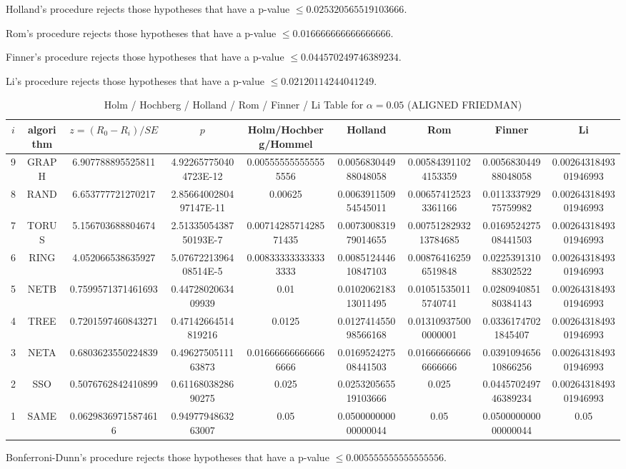 \documentclass[a4paper,10pt]{article}
\begin{document}
\begin{landscape}
Holland's procedure rejects those hypotheses that have a p-value $\le0.025320565519103666$.


Rom's procedure rejects those hypotheses that have a p-value $\le0.016666666666666666$.


Finner's procedure rejects those hypotheses that have a p-value $\le0.044570249746389234$.


Li's procedure rejects those hypotheses that have a p-value $\le0.02120114244041249$.



\newpage

\begin{table}[!htp]
\centering\scriptsize
\caption{Holm / Hochberg / Holland / Rom / Finner / Li Table for $\alpha=0.05$ (ALIGNED FRIEDMAN)}
\begin{tabular}{ccccccccc}
$i$&algorithm&$z=(R_0 - R_i)/SE$&$p$&Holm/Hochberg/Hommel&Holland&Rom&Finner&Li\\
\hline
9& GRAPH&6.907788895525811&4.922657750404723E-12&0.005555555555555556&0.005683044988048058&0.005843911024153359&0.005683044988048058&0.0026431849301946993\\
8& RAND&6.653777721270217&2.8566400280497147E-11&0.00625&0.006391150954545011&0.006574125233361166&0.011333792975759982&0.0026431849301946993\\
7& TORUS&5.156703688804674&2.5133505438750193E-7&0.0071428571428571435&0.007300831979014655&0.0075128293213784685&0.016952427508441503&0.0026431849301946993\\
6& RING&4.052066538635927&5.0767221396408514E-5&0.008333333333333333&0.008512444610847103&0.008764162596519848&0.022539131088302522&0.0026431849301946993\\
5& NETB&0.7599571371461693&0.4472802063409939&0.01&0.010206218313011495&0.010515350115740741&0.028094085180384143&0.0026431849301946993\\
4& TREE&0.7201597460843271&0.47142664514819216&0.0125&0.012741455098566168&0.013109375000000001&0.03361747021845407&0.0026431849301946993\\
3& NETA&0.6803623550224839&0.4962750511163873&0.016666666666666666&0.016952427508441503&0.016666666666666666&0.039109465610866256&0.0026431849301946993\\
2& SSO&0.5076762842410899&0.6116803828690275&0.025&0.025320565519103666&0.025&0.044570249746389234&0.0026431849301946993\\
1& SAME&0.06298369715874616&0.9497794863263007&0.05&0.050000000000000044&0.05&0.050000000000000044&0.05\\
\hline
\end{tabular}
\end{table}
Bonferroni-Dunn's procedure rejects those hypotheses that have a p-value $\le0.005555555555555556$.



\end{landscape}
\end{document}
